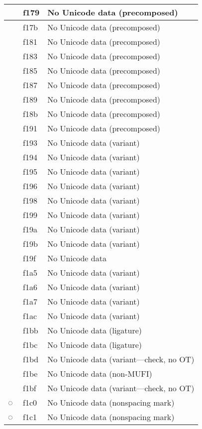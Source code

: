 \documentclass[12pt,letterpaper,openany]{book}
\begin{document}
\begin{center}
\begin{supertabular}{|m{0.25in}|m{0.5in}|m{4in}|}
			 & f179 & No Unicode data (precomposed)\\\hline
			 & f17b & No Unicode data (precomposed)\\\hline
			 & f181 & No Unicode data (precomposed)\\\hline
			 & f183 & No Unicode data (precomposed)\\\hline
			 & f185 & No Unicode data (precomposed)\\\hline
			 & f187 & No Unicode data (precomposed)\\\hline
			 & f189 & No Unicode data (precomposed)\\\hline
			 & f18b & No Unicode data (precomposed)\\\hline
			 & f191 & No Unicode data (precomposed)\\\hline
			 & f193 & No Unicode data (variant)\\\hline
			 & f194 & No Unicode data (variant)\\\hline
			 & f195 & No Unicode data (variant)\\\hline
			 & f196 & No Unicode data (variant)\\\hline
			 & f198 & No Unicode data (variant)\\\hline
			 & f199 & No Unicode data (variant)\\\hline
			 & f19a & No Unicode data (variant)\\\hline
			 & f19b & No Unicode data (variant)\\\hline
			 & f19f & No Unicode data\\\hline
			 & f1a5 & No Unicode data (variant)\\\hline
			 & f1a6 & No Unicode data (variant)\\\hline
			 & f1a7 & No Unicode data (variant)\\\hline
			 & f1ac & No Unicode data (variant)\\\hline
			 & f1bb & No Unicode data (ligature)\\\hline
			 & f1bc & No Unicode data (ligature)\\\hline
			 & f1bd & No Unicode data (variant---check, no OT)\\\hline
			 & f1be & No Unicode data (non-MUFI)\\\hline
			 & f1bf & No Unicode data (variant---check, no OT)\\\hline
			◌ & f1c0 & No Unicode data (nonspacing mark)\\\hline
			◌ & f1c1 & No Unicode data (nonspacing mark)\\\hline

\end{supertabular}
\end{center}
\end{document}
